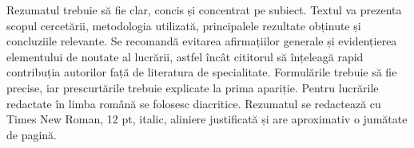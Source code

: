 \documentclass{utmabstract}
\begin{document}
\makeutmabstracttitle

\begin{rezumat}
Rezumatul trebuie să fie clar, concis și concentrat pe subiect. Textul va prezenta scopul cercetării, metodologia utilizată, principalele rezultate obținute și concluziile relevante. Se recomandă evitarea afirmațiilor generale și evidențierea elementului de noutate al lucrării, astfel încât cititorul să înțeleagă rapid contribuția autorilor față de literatura de specialitate. Formulările trebuie să fie precise, iar prescurtările trebuie explicate la prima apariție. Pentru lucrările redactate în limba română se folosesc diacritice. Rezumatul se redactează cu Times New Roman, 12 pt, italic, aliniere justificată și are aproximativ o jumătate de pagină.
\end{rezumat}

\end{document}

